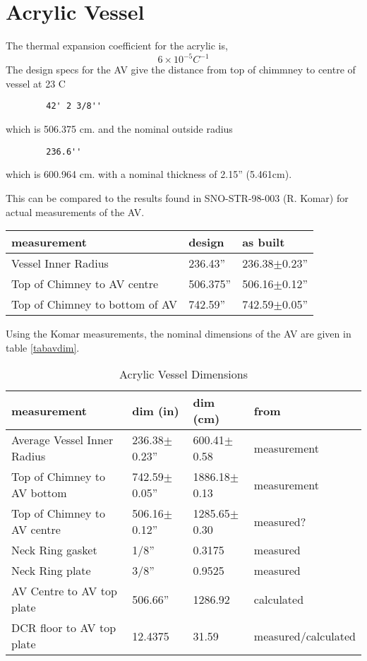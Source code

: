   
\section{Acrylic Vessel}
The thermal expansion coefficient for the acrylic is,
\[
        6 \times 10^{-5} C^{-1}
\]
The design specs for the AV give the 
distance from top of chimmney to centre of vessel at 23 C
\begin{verbatim}
        42' 2 3/8''
\end{verbatim}
which is 506.375 cm. and the
nominal outside radius
\begin{verbatim}
        236.6''
\end{verbatim} which is 600.964 cm.
with a nominal thickness of 2.15'' (5.461cm).

This can be compared to the results found in SNO-STR-98-003 (R. Komar) 
for actual measurements of the AV.
\begin{table}[htbp]
\begin{center}
\begin{tabular}{|l|l|l|}
\hline
measurement                    & design     & as built \\ \hline
Vessel Inner Radius            &  236.43''  & 236.38$\pm$0.23'' \\ 
Top of Chimney to AV centre    & 506.375''  & 506.16$\pm$0.12'' \\
Top of Chimney to bottom of AV & 742.59''   & 742.59$\pm$0.05'' \\
\hline
\end{tabular}
\end{center}
\end{table}
Using the Komar measurements, the nominal dimensions of the AV
are given in table \ref{tabavdim}.
\begin{table}[htbp]
\begin{center}
\begin{tabular}{|l|l|l|l|}
\hline
measurement                      & dim (in)   & dim (cm)& from \\ \hline
Average Vessel Inner Radius &  236.38$\pm$0.23'' & 600.41$\pm$0.58 
                            & measurement\\
Top of Chimney to AV bottom &  742.59$\pm$0.05''  & 1886.18$\pm$0.13
                            & measurement\\
Top of Chimney to AV centre &  506.16$\pm$0.12''  & 1285.65$\pm$0.30 
                            & measured?\\
Neck Ring gasket            &   1/8''             & 0.3175 & measured\\
Neck Ring plate             &   3/8''             & 0.9525 & measured \\
AV Centre to AV top plate   &  506.66''           & 1286.92 & calculated \\
DCR floor to AV top plate   &  12.4375       & 31.59 & measured/calculated\\
\hline
\end{tabular}
\caption[Acrylic Vessel Dimensions]
        {Acrylic Vessel Dimensions
        }
\end{center}
\end{table}
